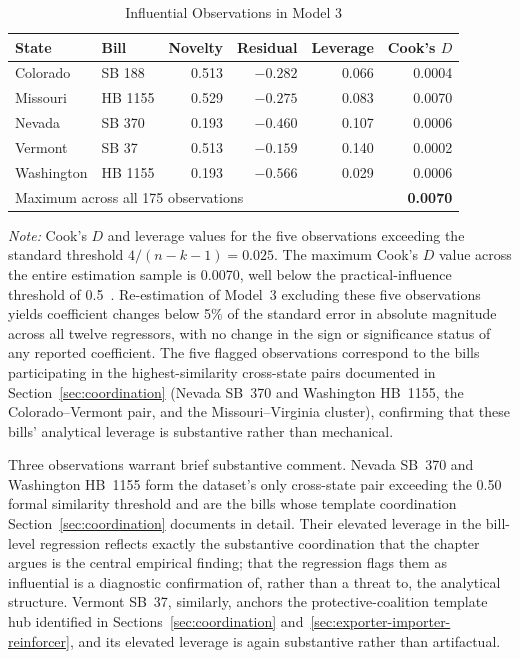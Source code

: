 \documentclass[12pt]{report}
\begin{document}
\begin{table}[htbp]
\centering
\caption{Influential Observations in Model 3}
\label{tab:cooksd}
\begin{threeparttable}
\begin{tabular}{llrrrr}
\toprule
State & Bill & Novelty & Residual & Leverage & Cook's $D$ \\
\midrule
Colorado    & SB 188   & 0.513 & $-0.282$ & 0.066 & 0.0004 \\
Missouri    & HB 1155  & 0.529 & $-0.275$ & 0.083 & 0.0070 \\
Nevada      & SB 370   & 0.193 & $-0.460$ & 0.107 & 0.0006 \\
Vermont     & SB 37    & 0.513 & $-0.159$ & 0.140 & 0.0002 \\
Washington  & HB 1155  & 0.193 & $-0.566$ & 0.029 & 0.0006 \\
\midrule
\multicolumn{5}{l}{Maximum across all 175 observations} & \textbf{0.0070} \\
\bottomrule
\end{tabular}
\begin{tablenotes}
\footnotesize
\item \textit{Note:} Cook's $D$ and leverage values for the five observations exceeding
  the standard threshold $4/(n-k-1) = 0.025$. The maximum Cook's $D$ value across the
  entire estimation sample is 0.0070, well below the practical-influence threshold of
  0.5~\parencite{cook1977}. Re-estimation of Model~3 excluding these five observations
  yields coefficient changes below 5\% of the standard error in absolute magnitude
  across all twelve regressors, with no change in the sign or significance status of
  any reported coefficient. The five flagged observations correspond to the bills
  participating in the highest-similarity cross-state pairs documented in
  Section~\ref{sec:coordination} (Nevada SB~370 and Washington HB~1155, the Colorado--Vermont
  pair, and the Missouri--Virginia cluster), confirming that these bills' analytical
  leverage is substantive rather than mechanical.
\end{tablenotes}
\end{threeparttable}
\end{table}

Three observations warrant brief substantive comment. Nevada SB~370 and Washington
HB~1155 form the dataset's only cross-state pair exceeding the 0.50 formal similarity
threshold and are the bills whose template coordination Section~\ref{sec:coordination} documents in detail. Their elevated leverage in the bill-level regression reflects exactly the substantive coordination that the chapter argues is the central empirical finding; that the regression flags them as influential is a diagnostic confirmation of, rather than a threat to, the analytical structure. Vermont SB~37, similarly, anchors the protective-coalition template hub identified in Sections~\ref{sec:coordination}
and~\ref{sec:exporter-importer-reinforcer}, and its elevated leverage is again substantive rather than
artifactual.
\end{document}
